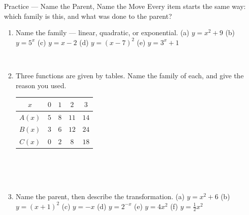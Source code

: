 \documentclass[10pt]{article}
\begin{document}

\vspace{0.15in}

\boxguard[24]
\begin{notesbox}{Practice --- Name the Parent, Name the Move}
\small
Every item starts the same way: which family is this, and what was done to the parent?

\begin{enumerate}[leftmargin=1.6em, itemsep=6pt, topsep=4pt]

\item Name the family --- linear, quadratic, or exponential.
\quad (a) $y=x^2+9$ \quad (b) $y=5^x$ \quad (c) $y=x-2$ \quad (d) $y=(x-7)^2$
\quad (e) $y=3^x+1$

\\

\item Three functions are given by tables. Name the family of each, and give the reason you used.
\smallskip

\renewcommand{\arraystretch}{1.25}
\begin{tabular}{@{}|c|c|c|c|c|@{}}
\hline
$x$ & $0$ & $1$ & $2$ & $3$ \\ \hline
$A(x)$ & $5$ & $8$ & $11$ & $14$ \\ \hline
$B(x)$ & $3$ & $6$ & $12$ & $24$ \\ \hline
$C(x)$ & $0$ & $2$ & $8$ & $18$ \\ \hline
\end{tabular}
\smallskip

\\
\\
\\

\item Name the parent, then describe the transformation.
\quad (a) $y=x^2+6$ \quad (b) $y=(x+1)^2$ \quad (c) $y=-x$ \quad (d) $y=2^{-x}$
\quad (e) $y=4x^2$ \quad (f) $y=\tfrac{1}{2}x^2$


\end{enumerate}
\end{notesbox}
\end{document}
